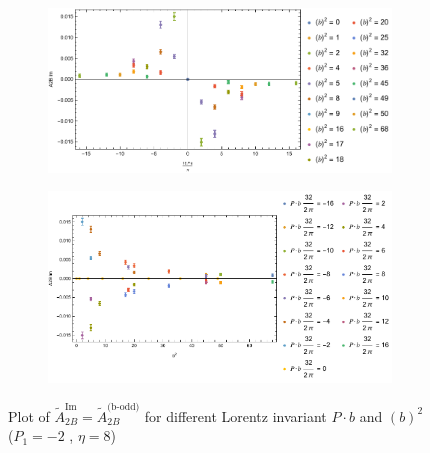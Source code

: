 \documentclass[]{article}
\numberwithin{equation}{section}
\newcommand{\tAmp}{\widetilde{A}}
\newcommand{\tAmp}{\ensuremath{\widetilde{A}^{(+)}}}
\begin{document}
\begin{figure}[h!]
     \centering
     \begin{subfigure}[b]{0.45\textwidth}
         \centering
         \includegraphics[width=\textwidth]{Amp_plots/bP_A2B_b_odd_P1_-2_eta_8.pdf}
     \end{subfigure}
     \begin{subfigure}[b]{0.45\textwidth}
         \centering
         \includegraphics[width=\textwidth]{Amp_plots/bsq_A2B_b_odd_P1_-2_eta_8.pdf}
     \end{subfigure}
        \caption{Plot of $\tAmp^{\text{Im}}_{2B}=\tAmp^{\text{(b-odd)}}_{2B}$ for different Lorentz invariant $P\cdot b$ and $(b)^2$  ($P_{1} = -2$ , $\eta=8$)}
\end{figure}
\end{document}
